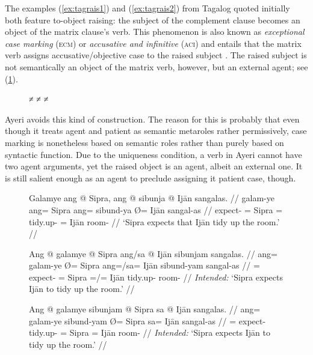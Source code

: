The examples (\ref{ex:tagrais1}) and (\ref{ex:tagrais2}) from Tagalog quoted
initially both feature to-object raising: the subject of the complement clause
becomes an object of the matrix clause's verb. This phenomenon is also known as
\emph{exceptional case marking} (\textsc{ecm}) or \emph{accusative and
infinitive} (\textsc{aci}) and entails that the matrix verb assigns
accusative/objective case to the raised subject \citep[439--442, 445, 451]
{carnie2013}. The raised subject is not semantically an object of the matrix
verb, however, but an external agent; see (\ref{ex:engraisxmps}).

\begin{figure}[h]
\pex\label{ex:engraisxmps}
\a {} ≠ 
\a {} ≠ 
\a {} ≠ 
\xe
\end{figure}

Ayeri avoids this kind of construction. The reason for this is probably that
even though it treats agent and patient as semantic metaroles rather
permissively, case marking is nonetheless based on semantic roles rather than
purely based on syntactic function. Due to the uniqueness condition, a verb in
Ayeri cannot have two agent arguments, yet the raised object is an agent,
albeit an external one. It is still salient enough as an agent to preclude
assigning it patient case, though.

\begin{figure}
\pex\label{ex:ayrrais5}
\a\label{ex:ayrrais5_1}\begingl
	\gla Galamye ang @ Sipra, ang @ sibunja {} @ Ijān sangalas. //
	\glb galam-ye ang= Sipra ang= sibund-ya Ø= Ijān sangal-as //
	\glc expect-\TsgF{} \Aarg{}= Sipra \AgtT{}= tidy.up-\TsgM{} \Top{}= Ijān
		room-\Parg{} //
	\glft `Sipra expects that Ijān tidy up the room.' //
\endgl

\a\label{ex:ayrrais5_2}\ljudge*\begingl
	\gla Ang @ galamye {} @ Sipra ang/sa @ Ijān sibunjam sangalas. //
	\glb ang= galam-ye Ø= Sipra ang=/sa= Ijān sibund-yam sangal-as //
	\glc \AgtT{}= expect-\TsgF{} \Top{}= Sipra \Aarg{}=/\Parg{}= Ijān
		tidy.up-\Ptcp{} room-\Parg{} //
	\glft \textit{Intended:} `Sipra expects Ijān to tidy up the room.' //
\endgl

\a\label{ex:ayrrais5_3}\ljudge*\begingl
	\gla Ang @ galamye sibunjam {} @ Sipra sa @ Ijān sangalas. //
	\glb ang= galam-ye sibund-yam Ø= Sipra sa= Ijān sangal-as //
	\glc \AgtT{}= expect-\TsgF{} tidy.up-\Ptcp{} \Top{}= Sipra \Parg{}= Ijān
		room-\Parg{} //
	\glft \textit{Intended:} `Sipra expects Ijān to tidy up the room.' //
\endgl

\xe
\end{figure}

